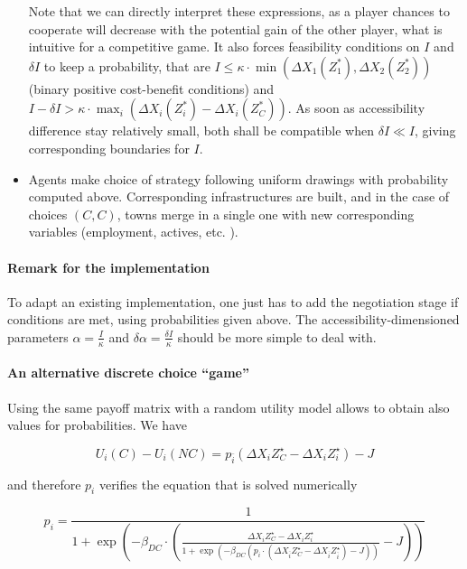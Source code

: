 \begin{itemize}
Note that we can directly interpret these expressions, as a player chances to cooperate will decrease with the potential gain of the other player, what is intuitive for a competitive game. It also forces feasibility conditions on $I$ and $\delta I$ to keep a probability, that are $I \leq \kappa\cdot \min(\Delta X_1(Z^{\ast}_1),\Delta X_2(Z^{\ast}_2))$ (binary positive cost-benefit conditions) and $I-\delta I > \kappa \cdot \max_i (\Delta X_i(Z^{\ast}_i)-\Delta X_i(Z^{\ast}_C))$. As soon as accessibility difference stay relatively small, both shall be compatible when $\delta I \ll I$, giving corresponding boundaries for $I$.

\item Agents make choice of strategy following uniform drawings with probability computed above. Corresponding infrastructures are built, and in the case of choices $(C,C)$, towns merge in a single one with new corresponding variables (employment, actives, etc. ).


\end{itemize}



\paragraph{Remark for the implementation}

To adapt an existing implementation, one just has to add the negotiation stage if conditions are met, using probabilities given above. The accessibility-dimensioned parameters $\alpha = \frac{I}{\kappa}$ and $\delta \alpha = \frac{\delta I}{\kappa}$ should be more simple to deal with.




\paragraph{An alternative discrete choice ``game''}

Using the same payoff matrix with a random utility model allows to obtain also values for probabilities. We have

\[
U_i(C) - U_i(NC) = p_{\bar{i}} \left( \Delta X_{i}{Z^{\star}_{C}} - \Delta X_{i}{Z^{\star}_{i}}\right) - J
\]

and therefore $p_i$ verifies the equation that is solved numerically

\[
p_i = \frac{1}{1 + \exp{\left(-\beta_{DC}\cdot \left(\frac{\Delta X_{i}{Z^{\star}_{C}} - \Delta X_{i}{Z^{\star}_{i}}}{1 + \exp{\left(- \beta_{DC}(p_i \cdot (\Delta X_{\bar{i}}{Z^{\star}_{C}} - \Delta X_{\bar{i}}{Z^{\star}_{\bar{i}}}) - J)\right)}} - J \right)\right)}}
\]

